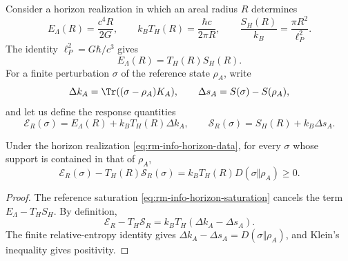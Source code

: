 Consider a horizon realization in which an areal radius \(R\)
determines
\begin{equation}
 E_\Lambda(R)=\frac{c^4R}{2G},
 \qquad
 k_BT_H(R)=\frac{\hbar c}{2\pi R},
 \qquad
 \frac{S_H(R)}{k_B}=\frac{\pi R^2}{\ell_P^2}.
 \label{eq:rm-info-horizon-data}
\end{equation}
The identity \(\ell_P^2=G\hbar/c^3\) gives
\begin{equation}
 \boxed{E_\Lambda(R)=T_H(R)S_H(R).}
 \label{eq:rm-info-horizon-saturation}
\end{equation}
For a finite perturbation \(\sigma\) of the reference state
\(\rho_A\), write
\begin{equation}
 \Delta k_A=\Tr((\sigma-\rho_A)K_A),
 \qquad
 \Delta s_A=S(\sigma)-S(\rho_A),
 \label{eq:rm-info-delta-k-s}
\end{equation}
and let us define the response quantities
\begin{equation}
 \mathcal E_R(\sigma)
 =E_\Lambda(R)+k_BT_H(R)\Delta k_A,
 \qquad
 \mathcal S_R(\sigma)
 =S_H(R)+k_B\Delta s_A.
 \label{eq:rm-info-response-energy-entropy}
\end{equation}

\begin{theorem}
\label{thm:rm-info-free-energy}
Under the horizon realization
\cref{eq:rm-info-horizon-data}, for every \(\sigma\) whose support is contained
in that of \(\rho_A\),
\begin{equation}
 \boxed{
 \mathcal E_R(\sigma)-T_H(R)\mathcal S_R(\sigma)
 =k_BT_H(R)D(\sigma\Vert\rho_A)
 \geq0.}
 \label{eq:rm-info-free-energy}
\end{equation}
\end{theorem}

\begin{proof}
The reference saturation
\cref{eq:rm-info-horizon-saturation} cancels the term
\(E_\Lambda-T_HS_H\). By definition,
\[
 \mathcal E_R-T_H\mathcal S_R
 =k_BT_H(\Delta k_A-\Delta s_A).
\]
The finite relative-entropy identity gives
\(\Delta k_A-\Delta s_A=D(\sigma\Vert\rho_A)\), and Klein's inequality
gives positivity.
\end{proof}

